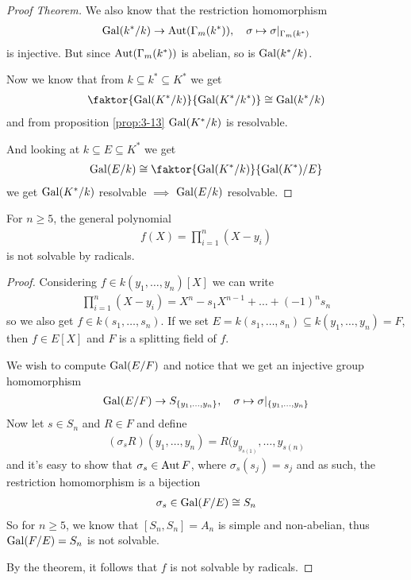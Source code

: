 \begin{proof}[Proof Theorem]
We also know that the restriction homomorphism
\begin{align*}
  \operatorname{Gal}(k^{\ast}/k) \to  \operatorname{Aut}(\Gamma_m(k^{\ast})), \quad \sigma \mapsto  \sigma|_{\Gamma_m(k^{\ast})}
\end{align*}
is injective. But since $\operatorname{Aut}(\Gamma_m(k^{\ast}))$ is abelian, so is $\operatorname{Gal}(k^{\ast}/k)$.


  Now we know that from $k \subseteq k^{\ast} \subseteq K^{\ast}$ we get
  \begin{align*}
    \faktor{\Gal(K^{\ast}/k)}{\Gal(K^{\ast}/k^{\ast})} \iso \Gal(k^{\ast}/k)
  \end{align*}
  and from proposition \ref{prop:3-13} $\operatorname{Gal}(K^{\ast}/k)$ is resolvable.

  And looking at $k \subseteq E \subseteq K^{\ast}$ we get
  \begin{align*}
    \Gal(E/k) \iso \faktor{\Gal(K^{\ast}/k)}{\Gal(K^{\ast})/E}
  \end{align*}
  we get $\operatorname{Gal}(K^{\ast}/k)$ resolvable $\implies$ $\operatorname{Gal}(E/k)$ resolvable.

\end{proof}


\begin{cor}
For $n \geq 5$, the general polynomial
\begin{align*}
  f(X) = \prod_{i=1}^{n}(X-y_i)
\end{align*}
is not solvable by radicals.
\end{cor}
\begin{proof}
  Considering $f \in k(y_1,\ldots,y_n)[X]$ we can write
  \begin{align*}
    \prod_{i=1}^{n}(X-y_i) = X^{n} - s_1X^{n-1} + \ldots +  (-1)^{n}s_n
  \end{align*}
  so we also get $f \in k(s_1,\ldots,s_n)$.
  If we set $E = k(s_1,\ldots,s_n) \subseteq k(y_{1}, \ldots, y_{n}) = F$, then $f \in E[X]$ and $F$ is a splitting field of $f$.

  We wish to compute $\operatorname{Gal}(E/F)$ and notice that we get an injective group homomorphism
  \begin{align*}
    \operatorname{Gal}(E/F) \to S_{\{y_{1}, \ldots, y_{n}\}}, \quad \sigma \mapsto  \sigma|_{\{y_{1}, \ldots, y_{n}\}}
  \end{align*}
  Now let $s \in S_n$ and $R \in F$ and define
  \begin{align*}
    (\sigma_sR)(y_{1}, \ldots, y_{n}) = R(y_{y_{s(1)}}, \ldots, y_{s(n)}
  \end{align*}
  and it's easy to show that $\sigma_s \in \operatorname{Aut} F$, where $\sigma_s(s_j) = s_j$ and as such, the restriction homomorphism is a bijection
  \begin{align*}
    \sigma_s \in \operatorname{Gal}(F/E) \cong S_n
  \end{align*}
  So for $n \geq 5$, we know that $[S_n,S_n] = A_n$ is simple and non-abelian, thus $\operatorname{Gal}(F/E) = S_n$ is not solvable.

  By the theorem, it follows that $f$ is not solvable by radicals.
\end{proof}


